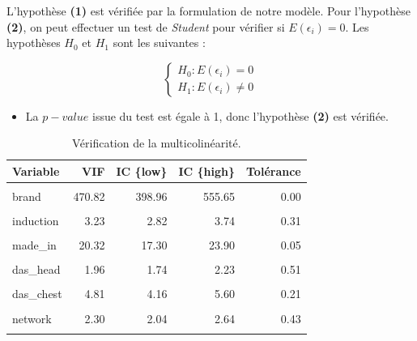 \documentclass[
  12pt,
]{report}
\providecommand{\tightlist}{%
  \setlength{\itemsep}{0pt}\setlength{\parskip}{0pt}}\usepackage{longtable,booktabs,array}
\begin{document}
L'hypothèse \textbf{(1)} est vérifiée par la formulation de notre
modèle. Pour l'hypothèse \textbf{(2)}, on peut effectuer un test de
\emph{Student} pour vérifier si \(E(\epsilon_i) = 0\). Les hypothèses
\(H_0\) et \(H_1\) sont les suivantes :

\[
\begin{cases}
H_0 : E(\epsilon_i) = 0\\
H_1 : E(\epsilon_i) \neq 0
\end{cases}
\]

\vspace{1em}

\begin{itemize}
\tightlist
\item
  La \(p-value\) issue du test est égale à 1, donc l'hypothèse
  \textbf{(2)} est vérifiée.
\end{itemize}

\begin{table}[!h]
\centering
\caption{\label{tab:collinearity}Vérification de la multicolinéarité.}
\centering
\begin{tabular}[t]{lrrrr}
\toprule
\textbf{Variable} & \textbf{VIF} & \textbf{IC \{low\}} & \textbf{IC \{high\}} & \textbf{Tolérance}\\
\midrule
\cellcolor{gray!10}{storage} & \cellcolor{gray!10}{1.99} & \cellcolor{gray!10}{1.77} & \cellcolor{gray!10}{2.27} & \cellcolor{gray!10}{0.50}\\
brand & 470.82 & 398.96 & 555.65 & 0.00\\
\cellcolor{gray!10}{ram} & \cellcolor{gray!10}{4.28} & \cellcolor{gray!10}{3.71} & \cellcolor{gray!10}{4.98} & \cellcolor{gray!10}{0.23}\\
induction & 3.23 & 2.82 & 3.74 & 0.31\\
\cellcolor{gray!10}{screen\_size} & \cellcolor{gray!10}{1.95} & \cellcolor{gray!10}{1.73} & \cellcolor{gray!10}{2.22} & \cellcolor{gray!10}{0.51}\\
\addlinespace
made\_in & 20.32 & 17.30 & 23.90 & 0.05\\
\cellcolor{gray!10}{upgrade\_storage} & \cellcolor{gray!10}{3.72} & \cellcolor{gray!10}{3.23} & \cellcolor{gray!10}{4.31} & \cellcolor{gray!10}{0.27}\\
das\_head & 1.96 & 1.74 & 2.23 & 0.51\\
\cellcolor{gray!10}{das\_limbs} & \cellcolor{gray!10}{2.53} & \cellcolor{gray!10}{2.23} & \cellcolor{gray!10}{2.91} & \cellcolor{gray!10}{0.40}\\
das\_chest & 4.81 & 4.16 & 5.60 & 0.21\\
\addlinespace
\cellcolor{gray!10}{fast\_charging} & \cellcolor{gray!10}{1.27} & \cellcolor{gray!10}{1.17} & \cellcolor{gray!10}{1.43} & \cellcolor{gray!10}{0.79}\\
network & 2.30 & 2.04 & 2.64 & 0.43\\
\cellcolor{gray!10}{ppi} & \cellcolor{gray!10}{2.35} & \cellcolor{gray!10}{2.08} & \cellcolor{gray!10}{2.70} & \cellcolor{gray!10}{0.42}\\
\bottomrule
\end{tabular}
\end{table}
\end{document}
